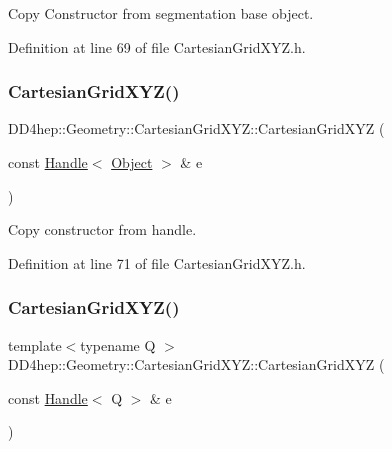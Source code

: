 Copy Constructor from segmentation base object. 



Definition at line 69 of file Cartesian\+Grid\+X\+Y\+Z.\+h.

\hypertarget{class_d_d4hep_1_1_geometry_1_1_cartesian_grid_x_y_z_a81acd66a472e7cea44351a2120ef789a}{}\label{class_d_d4hep_1_1_geometry_1_1_cartesian_grid_x_y_z_a81acd66a472e7cea44351a2120ef789a} 
\subsubsection{\texorpdfstring{Cartesian\+Grid\+X\+Y\+Z()}{CartesianGridXYZ()}\hspace{0.1cm}{\footnotesize\ttfamily [4/5]}}
{\footnotesize\ttfamily D\+D4hep\+::\+Geometry\+::\+Cartesian\+Grid\+X\+Y\+Z\+::\+Cartesian\+Grid\+X\+YZ (\begin{DoxyParamCaption}\item[{const \hyperlink{class_d_d4hep_1_1_handle}{Handle}$<$ \hyperlink{class_d_d4hep_1_1_geometry_1_1_cartesian_grid_x_y_z_a14399d469a4ddf78e0df3e14276a3e4e}{Object} $>$ \&}]{e }\end{DoxyParamCaption})\hspace{0.3cm}{\ttfamily [inline]}}



Copy constructor from handle. 



Definition at line 71 of file Cartesian\+Grid\+X\+Y\+Z.\+h.

\hypertarget{class_d_d4hep_1_1_geometry_1_1_cartesian_grid_x_y_z_accc58924d7f9212a5b82f329f47bf9c0}{}\label{class_d_d4hep_1_1_geometry_1_1_cartesian_grid_x_y_z_accc58924d7f9212a5b82f329f47bf9c0} 
\subsubsection{\texorpdfstring{Cartesian\+Grid\+X\+Y\+Z()}{CartesianGridXYZ()}\hspace{0.1cm}{\footnotesize\ttfamily [5/5]}}
{\footnotesize\ttfamily template$<$typename Q $>$ \\
D\+D4hep\+::\+Geometry\+::\+Cartesian\+Grid\+X\+Y\+Z\+::\+Cartesian\+Grid\+X\+YZ (\begin{DoxyParamCaption}\item[{const \hyperlink{class_d_d4hep_1_1_handle}{Handle}$<$ Q $>$ \&}]{e }\end{DoxyParamCaption})\hspace{0.3cm}{\ttfamily [inline]}}



